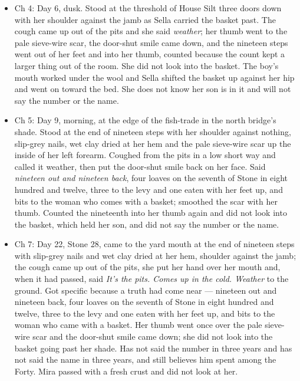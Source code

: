 \documentclass{design/chronicle}
\begin{document}
{\begin{itemize}[leftmargin=1.4em,itemsep=1pt,topsep=3pt,parsep=0pt]
\end{itemize}

\begin{itemize}[leftmargin=1.4em,itemsep=1pt,topsep=3pt,parsep=0pt]

\item Ch 4: Day 6, dusk. Stood at the threshold of House Silt three doors down with her shoulder against the jamb as Sella carried the basket past. The cough came up out of the pits and she said \emph{weather}; her thumb went to the pale sieve-wire scar, the door-shut smile came down, and the nineteen steps went out of her feet and into her thumb, counted because the count kept a larger thing out of the room. She did not look into the basket. The boy’s mouth worked under the wool and Sella shifted the basket up against her hip and went on toward the bed. She does not know her son is in it and will not say the number or the name.

\end{itemize}

\begin{itemize}[leftmargin=1.4em,itemsep=1pt,topsep=3pt,parsep=0pt]

\item Ch 5: Day 9, morning, at the edge of the fish-trade in the north bridge’s shade. Stood at the end of nineteen steps with her shoulder against nothing, slip-grey nails, wet clay dried at her hem and the pale sieve-wire scar up the inside of her left forearm. Coughed from the pits in a low short way and called it weather, then put the door-shut smile back on her face. Said \emph{nineteen out and nineteen back}, four loaves on the seventh of Stone in eight hundred and twelve, three to the levy and one eaten with her feet up, and bits to the woman who comes with a basket; smoothed the scar with her thumb. Counted the nineteenth into her thumb again and did not look into the basket, which held her son, and did not say the number or the name.

\end{itemize}

\begin{itemize}[leftmargin=1.4em,itemsep=1pt,topsep=3pt,parsep=0pt]

\item Ch 7: Day 22, Stone 28, came to the yard mouth at the end of nineteen steps with slip-grey nails and wet clay dried at her hem, shoulder against the jamb; the cough came up out of the pits, she put her hand over her mouth and, when it had passed, said \emph{It’s the pits. Comes up in the cold. Weather} to the ground. Got specific because a truth had come near --- nineteen out and nineteen back, four loaves on the seventh of Stone in eight hundred and twelve, three to the levy and one eaten with her feet up, and bits to the woman who came with a basket. Her thumb went once over the pale sieve-wire scar and the door-shut smile came down; she did not look into the basket going past her shade. Has not said the number in three years and has not said the name in three years, and still believes him spent among the Forty. Mira passed with a fresh crust and did not look at her.


\end{itemize}}
\end{document}

